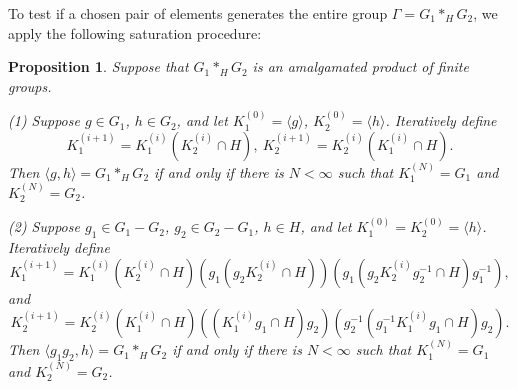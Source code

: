 \documentclass[12pt,leqno]{amsart}
\newcommand{\2}{L^2_{\rm per}(0, T)}
\newtheorem{prop}{Proposition}[section]
\numberwithin{equation}{section}
\numberwithin{figure}{section}
\begin{document}
To test if a chosen pair of elements generates the entire group $\Gamma = G_1*_H G_2$, we apply the following saturation procedure:
\begin{prop}
    Suppose that $G_1*_H G_2$ is an amalgamated product of finite groups.
    
    (1) Suppose $g\in G_1$, $h\in G_2$, and let $K_1^{(0)} = \langle g\rangle$, $K_2^{(0)} = \langle h\rangle$. Iteratively define
    \[
    K_1^{(i+1)} = K_1^{(i)}(K_2^{(i)}\cap H),\ K_2^{(i+1)} = K_2^{(i)}(K_1^{(i)}\cap H).
    \]
    Then $\langle g,h\rangle = G_1*_H G_2$ if and only if there is $N<\infty$ such that $K_1^{(N)} = G_1$ and $K_2^{(N)} = G_2$.

    (2) Suppose $g_1\in G_1 - G_2$, $g_2\in G_2 - G_1$, $h\in H$, and let $K_1^{(0)} = K_2^{(0)} = \langle h\rangle$. Iteratively define
    \[
    K_1^{(i+1)} = K_1^{(i)}(K_2^{(i)}\cap H)\left(g_1(g_2K_2^{(i)}\cap H)\right)\left(g_1(g_2K_2^{(i)}g_2^{-1}\cap H)g_1^{-1}\right),
    \]
    and
    \[
    K_2^{(i+1)} = K_2^{(i)}(K_1^{(i)}\cap H)\left((K_1^{(i)}g_1\cap H)g_2\right)\left(g_2^{-1}(g_1^{-1}K_1^{(i)}g_1\cap H)g_2\right).
    \]
    Then $\langle g_1g_2,h\rangle = G_1*_H G_2$ if and only if there is $N<\infty$ such that $K_1^{(N)} = G_1$ and $K_2^{(N)} = G_2$.
\end{prop}
\end{document}
